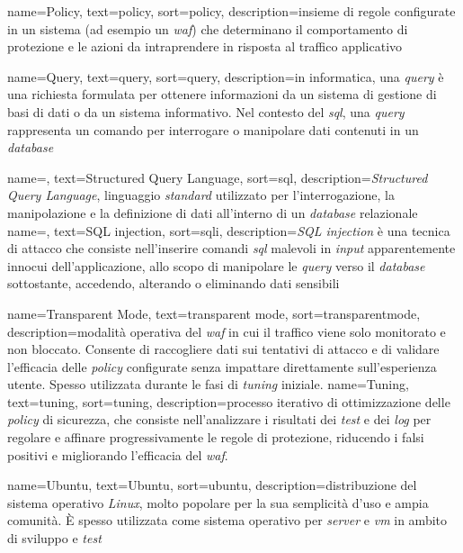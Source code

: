  {
    name=Policy,
    text=policy,
    sort=policy,
    description={insieme di regole configurate in un sistema (ad esempio un \emph{\gls{waf}}) che determinano il comportamento di protezione e le azioni da intraprendere in risposta al traffico applicativo}
}

 {
    name=Query,
    text=query,
    sort=query,
    description={in informatica, una \emph{query} è una richiesta formulata per ottenere informazioni da un sistema di gestione di basi di dati o da un sistema informativo. Nel contesto del \emph{\gls{sql}}, una \emph{query} rappresenta un comando per interrogare o manipolare dati contenuti in un \emph{database}}
}


 {
    name=,
    text=Structured Query Language,
    sort=sql,
    description={\emph{Structured Query Language}, linguaggio \emph{standard} utilizzato per l'interrogazione, la manipolazione e la definizione di dati all'interno di un \emph{database} relazionale}
}
 {
    name=,
    text=SQL injection,
    sort=sqli,
    description={\emph{SQL injection} è una tecnica di attacco che consiste nell'inserire comandi \emph{\gls{sql}} malevoli in \emph{input} apparentemente innocui dell'applicazione, allo scopo di manipolare le \emph{\gls{query}} verso il \emph{database} sottostante, accedendo, alterando o eliminando dati sensibili}
}

 {
    name=Transparent Mode,
    text=transparent mode,
    sort=transparentmode,
    description={modalità operativa del \emph{\gls{waf}} in cui il traffico viene solo monitorato e non bloccato. Consente di raccogliere dati sui tentativi di attacco e di validare l'efficacia delle \emph{\gls{policy}} configurate senza impattare direttamente sull'esperienza utente. Spesso utilizzata durante le fasi di \emph{\gls{tuning}} iniziale.}
}
 {
    name=Tuning,
    text=tuning,
    sort=tuning,
    description={processo iterativo di ottimizzazione delle \emph{\gls{policy}} di sicurezza, che consiste nell'analizzare i risultati dei \emph{test} e dei \emph{\gls{log}} per regolare e affinare progressivamente le regole di protezione, riducendo i falsi positivi e migliorando l'efficacia del \emph{\gls{waf}}.}
}

 {
    name=Ubuntu,
    text=Ubuntu,
    sort=ubuntu,
    description={distribuzione del sistema operativo \emph{Linux}, molto popolare per la sua semplicità d'uso e ampia comunità. È spesso utilizzata come sistema operativo per \emph{server} e \emph{\gls{vm}} in ambito di sviluppo e \emph{test}}
}

